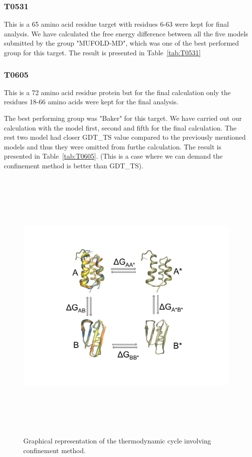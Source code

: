 \documentclass[12pt]{article}
\begin{document}
\subsubsection{T0531}

This is a 65 amino acid residue target with residues 6-63 were kept for final analysis. We have
calculated the free energy difference between all the five models submitted by the group
"MUFOLD-MD", which was one of the best performed group for this target.  The result is presented in
Table~\protect\ref{tab:T0531}



\subsubsection{T0605}

This is a 72 amino acid residue protein but for the final calculation only the residues 18-66 amino acids were kept for the final analysis.

The best performing group was "Baker" for this target. We have carried out our calculation with the model first, second and fifth for the
final calculation. The rest two model had closer GDT\_TS value compared to the previously mentioned models and thus they were omitted from
furthe calculation. The result is presented in Table~\protect\ref{tab:T0605}. (This is a case where we can demand the confinement
method is better than GDT\_TS).


\begin{figure}
\begin{center}
\includegraphics[width=14cm,height=14cm]{method.pdf}
\end{center}
\caption{Graphical representation of the thermodynamic cycle involving confinement method.}
\label{fig:method}
\end{figure}
\end{document}
